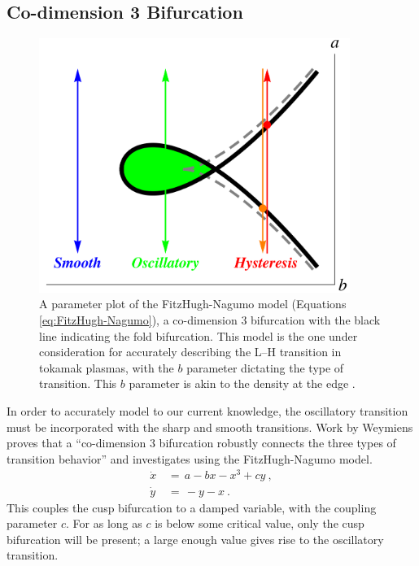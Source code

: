 \subsection{Co-dimension 3 Bifurcation}
\begin{figure}[tb] %
\begin{minipage}{0.49\linewidth}
	\centering
	\includegraphics[width=0.9\textwidth]{../Graphics/Bif_Graphs/3_transitions_single_simple.png}
\end{minipage}
\hfill
\begin{minipage}{0.49\linewidth}
	\caption{A parameter plot of the FitzHugh-Nagumo model (Equations \ref{eq:FitzHugh-Nagumo}), a co-dimension 3 bifurcation with the black line indicating the fold bifurcation.
	This model is the one under consideration for accurately describing the L--H transition in tokamak plasmas, with the $b$ parameter dictating the type of transition.
	This $b$ parameter is akin to the density at the edge \cite{weymiens_bifurcation_2014}.}
	\label{fig:co-3}
\end{minipage}
\end{figure}

In order to accurately model to our current knowledge, the oscillatory transition must be incorporated with the sharp and smooth transitions.
Work by Weymiens \cite{weymiens_bifurcation_2014} proves that a ``co-dimension 3 bifurcation robustly connects the three types of transition behavior'' and investigates using the FitzHugh-Nagumo model.
\begin{subequations}
\begin{align} %
	\dot{x} \,&=\, a - bx - x^3 + cy~, \\
	\dot{y} \,&=\, -y - x~.
\end{align}
	\label{eq:FitzHugh-Nagumo}
\end{subequations}
This couples the cusp bifurcation to a damped variable, with the coupling parameter $c$.
For as long as $c$ is below some critical value, only the cusp bifurcation will be present; a large enough value gives rise to the oscillatory transition.

